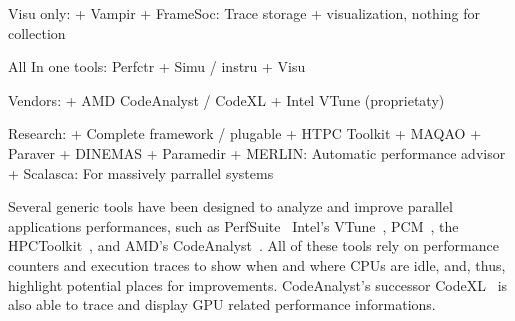 
Visu only:
    + Vampir
    + FrameSoc: Trace storage + visualization, nothing for collection

All In one tools: Perfctr + Simu / instru + Visu

Vendors:
    + AMD CodeAnalyst / CodeXL
    + Intel VTune (proprietaty)

Research:
    + Complete framework / plugable
        + HTPC Toolkit
        + MAQAO
        + Paraver
            + DINEMAS
            + Paramedir
    + MERLIN: Automatic performance advisor
    + Scalasca: For massively parrallel systems

Several generic tools have been designed to analyze and improve parallel
applications performances, such as \gls{PerfSuite}~\cite{Kufrin05Perfsuite}
\gls{Intel}'s \gls{VTune}~\cite{Reinders05VTune},
\gls{PCM}~\cite{Wilhalm16Intel}, the
\gls{HPCToolkit}~\cite{Adhianto10HPCTOOLKIT}, and \gls{AMD}'s
\gls{CodeAnalyst}~\cite{Drongowski08introduction}. All of these tools rely on
performance counters and execution traces to show when and where CPUs are
idle, and, thus, highlight potential places for improvements.
\gls{CodeAnalyst}'s successor \gls{CodeXL}~\cite{AMDCodeXL} is also able to
trace and display \gls{GPU} related performance informations.

